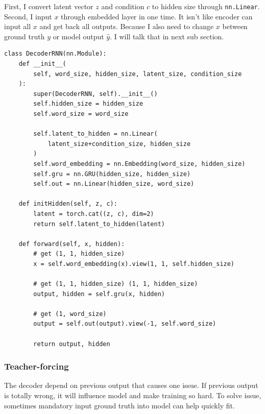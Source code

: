 \documentclass[12pt]{article}
\begin{document}
First, I convert latent vector $z$ and condition $c$ to hidden size through \verb|nn.Linear|. Second, I input $x$ through embedded layer in one time. It isn't like encoder can input all $x$ and get back all outputs. Because I also need to change $x$ between ground truth $y$ or model output $\hat{y}$. I will talk that in next sub section.

\begin{verbatim}
class DecoderRNN(nn.Module):
    def __init__(
        self, word_size, hidden_size, latent_size, condition_size
    ):
        super(DecoderRNN, self).__init__()
        self.hidden_size = hidden_size
        self.word_size = word_size

        self.latent_to_hidden = nn.Linear(
            latent_size+condition_size, hidden_size
        )
        self.word_embedding = nn.Embedding(word_size, hidden_size)
        self.gru = nn.GRU(hidden_size, hidden_size)
        self.out = nn.Linear(hidden_size, word_size)
    
    def initHidden(self, z, c):
        latent = torch.cat((z, c), dim=2)
        return self.latent_to_hidden(latent)
    
    def forward(self, x, hidden):
        # get (1, 1, hidden_size)
        x = self.word_embedding(x).view(1, 1, self.hidden_size)
        
        # get (1, 1, hidden_size) (1, 1, hidden_size)
        output, hidden = self.gru(x, hidden)
            
        # get (1, word_size)
        output = self.out(output).view(-1, self.word_size)
        
        return output, hidden
\end{verbatim}

\subsubsection{Teacher-forcing}

The decoder depend on previous output that causes one issue. If previous output is totally wrong, it will influence model and make training so hard. To solve issue, sometimes mandatory input ground truth into model can help quickly fit.
\end{document}

